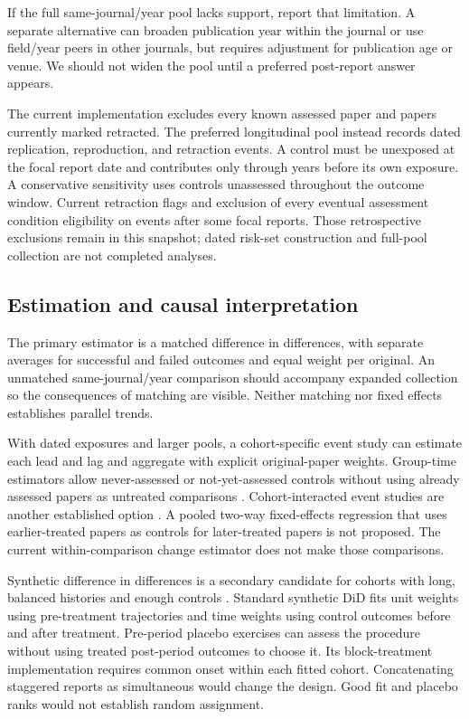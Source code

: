 If the full same-journal/year pool lacks support, report that limitation. A separate alternative can broaden publication year within the journal or use field/year peers in other journals, but requires adjustment for publication age or venue. We should not widen the pool until a preferred post-report answer appears.

The current implementation excludes every known assessed paper and papers currently marked retracted. The preferred longitudinal pool instead records dated replication, reproduction, and retraction events. A control must be unexposed at the focal report date and contributes only through years before its own exposure. A conservative sensitivity uses controls unassessed throughout the outcome window. Current retraction flags and exclusion of every eventual assessment condition eligibility on events after some focal reports. Those retrospective exclusions remain in this snapshot; dated risk-set construction and full-pool collection are not completed analyses.

\subsection{Estimation and causal interpretation}
The primary estimator is a matched difference in differences, with separate averages for successful and failed outcomes and equal weight per original. An unmatched same-journal/year comparison should accompany expanded collection so the consequences of matching are visible. Neither matching nor fixed effects establishes parallel trends.

With dated exposures and larger pools, a cohort-specific event study can estimate each lead and lag and aggregate with explicit original-paper weights. Group-time estimators allow never-assessed or not-yet-assessed controls without using already assessed papers as untreated comparisons \citep{callaway2021}. Cohort-interacted event studies are another established option \citep{sun2021}. A pooled two-way fixed-effects regression that uses earlier-treated papers as controls for later-treated papers is not proposed. The current within-comparison change estimator does not make those comparisons.

Synthetic difference in differences is a secondary candidate for cohorts with long, balanced histories and enough controls \citep{arkhangelsky2021}. Standard synthetic DiD fits unit weights using pre-treatment trajectories and time weights using control outcomes before and after treatment. Pre-period placebo exercises can assess the procedure without using treated post-period outcomes to choose it. Its block-treatment implementation requires common onset within each fitted cohort. Concatenating staggered reports as simultaneous would change the design. Good fit and placebo ranks would not establish random assignment.

